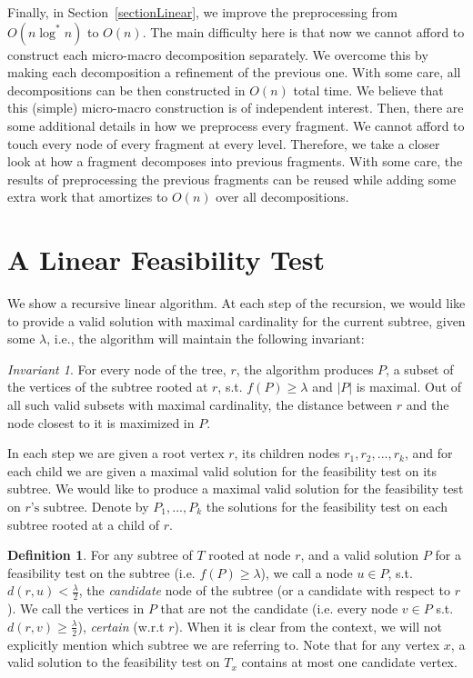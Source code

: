 \documentclass[11pt,a4paper]{article}
\newtheorem{algo}{Algorithm}[section]
\theoremstyle{definition}
\newtheorem{definition}{Definition}
\theoremstyle{remark}
\newtheorem{invariant}{Invariant}
\begin{document}
Finally, in Section~\ref{sectionLinear}, we improve the preprocessing from $O(n\log^* n)$ to $O(n)$. 
The main difficulty here is that now we cannot afford to construct each micro-macro decomposition separately. We overcome this by making each decomposition
a refinement of the previous one. With some care, all decompositions can be then constructed in
$O(n)$ total time. We believe that this (simple) micro-macro construction is of independent interest. Then, there
are some additional details in how we preprocess every fragment. We cannot afford to touch
every node of every fragment at every level. Therefore, we take a closer look at how a fragment
decomposes into previous fragments. With some care, the results of preprocessing the previous
fragments can be reused while adding some extra work that amortizes to $O(n)$ over all decompositions.

\section{A Linear Feasibility Test}\label{linear F.T.}
We show a recursive linear algorithm. At each step of the recursion, we would like to provide a valid solution with maximal cardinality for the current subtree, given some $\lambda$, i.e., the algorithm will maintain the following invariant:
\begin{invariant}\label{Maximality of P and distance of closest node invariant}
For every node of the tree, $r$, the algorithm produces $P$, a subset of the vertices of the subtree rooted at $r$, s.t. $f(P)\geq\lambda$ and $|P|$ is maximal. Out of all such valid subsets with maximal cardinality, the distance between $r$ and the node closest to it is maximized in $P$.
\end{invariant}
In each step we are given a root vertex $r$, its children nodes $r_{1},r_{2},...,r_{k}$, and for each child we are given a maximal valid solution for the feasibility test on its subtree. We would like to produce a maximal valid solution for the feasibility test on $r\text{'s subtree}$.
Denote by $P_{1},...,P_{k}$ the solutions for the feasibility test on each subtree rooted at a child of $r$.
\begin{definition}
For any subtree of $T$ rooted at node $r$, and a valid solution $P$ for a feasibility test on the subtree (i.e. $f(P)\geq\lambda$), we call a node $u\in P$, s.t. $d(r,u)<\frac{\lambda}{2}$, the \emph{candidate} node of the subtree (or a candidate with respect to $r$). We call the vertices in $P$ that are not the candidate (i.e. every node $v \in P$ s.t. $d(r,v)\geq \frac{\lambda}{2}$), \emph{certain} (w.r.t $r$). When it is clear from the context, we will not explicitly mention which subtree we are referring to.
Note that for any vertex $x$, a valid solution to the feasibility test on $T_x$ contains at most one candidate vertex.
\end{definition}
\end{document}
